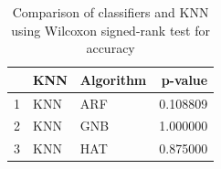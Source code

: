 \begin{table}
\footnotesize
\caption{Comparison of classifiers and KNN using Wilcoxon signed-rank test for accuracy}
\label{tab:KNN wilcoxon ACC comparison}
\begin{tabular}{lllr}
\hline
 & KNN & Algorithm & p-value \\
\hline
1 & KNN & ARF & 0.108809 \\
2 & KNN & GNB & 1.000000 \\
3 & KNN & HAT & 0.875000 \\
\hline
\end{tabular}
\end{table}
